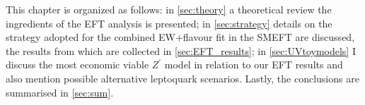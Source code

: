 This chapter is organized as follows: in \autoref{sec:theory} a theoretical review the ingredients of the EFT analysis is presented; in \autoref{sec:strategy} details on the strategy adopted for the combined EW+flavour fit in the SMEFT are discussed, the results from which are collected in \autoref{sec:EFT_results}; in \autoref{sec:UVtoymodels} I discuss the most economic viable $Z^{\prime}$ model in relation to our EFT results and also mention possible alternative leptoquark scenarios. Lastly, the conclusions are summarised in \autoref{sec:sum}.

